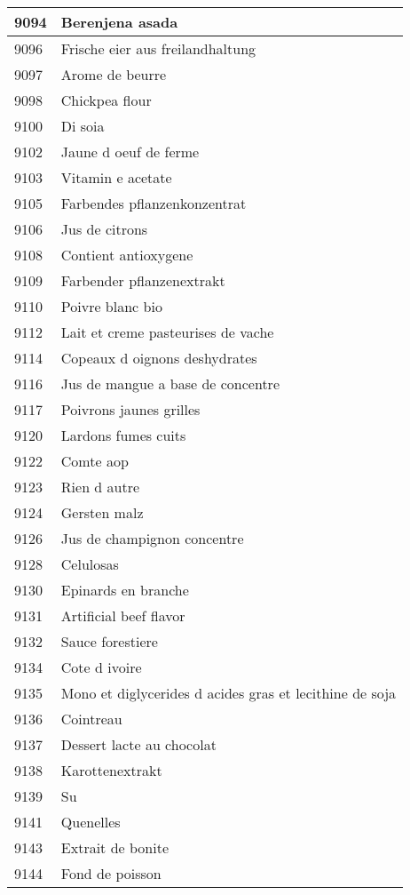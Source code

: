 \begin{longtable}{|l|l|}
9094 & Berenjena asada \\ \hline 
9096 & Frische eier aus freilandhaltung \\ \hline 
9097 & Arome de beurre \\ \hline 
9098 & Chickpea flour \\ \hline 
9100 & Di soia \\ \hline 
9102 & Jaune d oeuf de ferme \\ \hline 
9103 & Vitamin e acetate \\ \hline 
9105 & Farbendes pflanzenkonzentrat \\ \hline 
9106 & Jus de citrons \\ \hline 
9108 & Contient antioxygene \\ \hline 
9109 & Farbender pflanzenextrakt \\ \hline 
9110 & Poivre blanc bio \\ \hline 
9112 & Lait et creme pasteurises de vache \\ \hline 
9114 & Copeaux d oignons deshydrates \\ \hline 
9116 & Jus de mangue a base de concentre \\ \hline 
9117 & Poivrons jaunes grilles \\ \hline 
9120 & Lardons fumes cuits \\ \hline 
9122 & Comte aop \\ \hline 
9123 & Rien d autre \\ \hline 
9124 & Gersten malz \\ \hline 
9126 & Jus de champignon concentre \\ \hline 
9128 & Celulosas \\ \hline 
9130 & Epinards en branche \\ \hline 
9131 & Artificial beef flavor \\ \hline 
9132 & Sauce forestiere \\ \hline 
9134 & Cote d ivoire \\ \hline 
9135 & Mono et diglycerides d acides gras et lecithine de soja \\ \hline 
9136 & Cointreau \\ \hline 
9137 & Dessert lacte au chocolat \\ \hline 
9138 & Karottenextrakt \\ \hline 
9139 & Su \\ \hline 
9141 & Quenelles \\ \hline 
9143 & Extrait de bonite \\ \hline 
9144 & Fond de poisson \\ \hline 

\end{longtable}

